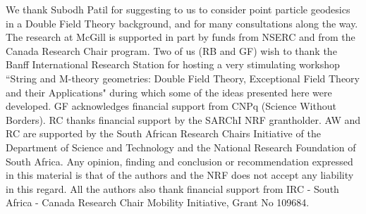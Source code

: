 \documentclass[prd, aps, superscriptaddress, preprintnumbers, twocolumn, floatfix, nofootinbib]{revtex4}
\begin{document}
We thank Subodh Patil for suggesting to us to consider point particle
geodesics in a Double Field Theory background, and for many consultations
along the way. The research at McGill is supported in
part by funds from NSERC and from the Canada Research Chair program.
Two of us (RB and GF) wish to thank the Banff International Research
Station for hosting a very stimulating workshop ``String and M-theory geometries: Double Field Theory,
Exceptional Field Theory and their Applications" during which some of the
ideas presented here were developed. GF acknowledges financial support from
CNPq (Science Without Borders). RC thanks financial support by the SARChI NRF grantholder. AW and RC are supported by the South African Research Chairs Initiative of the Department of Science and Technology and the National Research Foundation of South Africa. Any opinion, finding and conclusion or recommendation expressed in this material is that of the authors and the NRF does not accept any liability in this regard. All the authors also thank financial support from  IRC - South Africa - Canada Research Chair Mobility Initiative, Grant No 109684.
\end{document}
